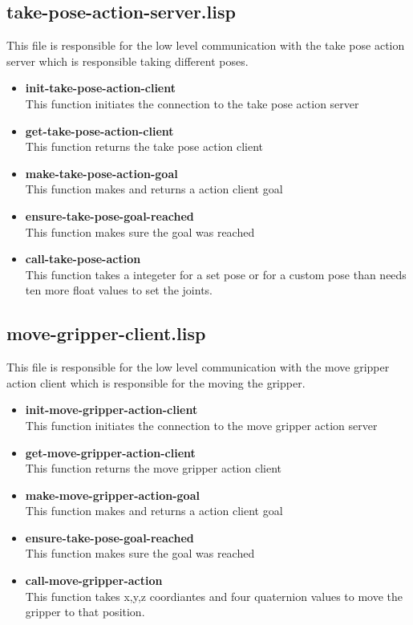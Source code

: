 \documentclass[main.tex]{subfiles}
\begin{document}
		\subsection{take-pose-action-server.lisp}
		This file is responsible for the low level communication with the
		take pose action server which is responsible taking different poses.
		\begin{itemize}
			\item \textbf{init-take-pose-action-client} \\
			This function initiates the connection to the take pose action server
			\item \textbf{get-take-pose-action-client} \\
			This function returns the take pose action client
			\item \textbf{make-take-pose-action-goal} \\
			This function makes and returns a action client goal
			\item \textbf{ensure-take-pose-goal-reached} \\
            This function makes sure the goal was reached
			\item \textbf{call-take-pose-action} \\
			This function takes a integeter for a set pose or for a custom pose than needs ten more float values to set the joints.
		\end{itemize}
		\subsection{move-gripper-client.lisp}
		This file is responsible for the low level communication with the
		move gripper action client which is responsible for the moving the gripper.
		\begin{itemize}
			\item \textbf{init-move-gripper-action-client} \\
			This function initiates the connection to the move gripper action server
			\item \textbf{get-move-gripper-action-client} \\
			This function returns the move gripper action client
			\item \textbf{make-move-gripper-action-goal} \\
			This function makes and returns a action client goal
			\item \textbf{ensure-take-pose-goal-reached} \\
            This function makes sure the goal was reached
			\item \textbf{call-move-gripper-action} \\
			This function takes x,y,z coordiantes and four quaternion values to move the gripper to that position. 
		\end{itemize}
\end{document}

